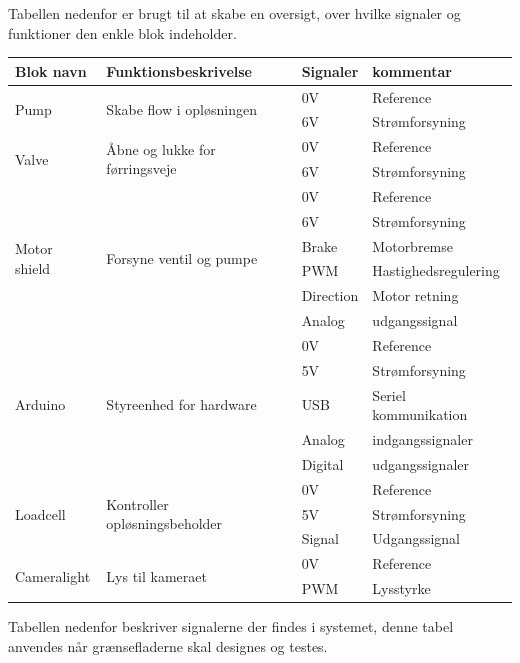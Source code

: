 Tabellen nedenfor er brugt til at skabe en oversigt, over hvilke signaler og funktioner den enkle blok indeholder.

\begin{center}
		\begin{longtable}{ | m{2cm} | m{6cm}| m{2cm}| m{4.5cm}| } 
			\hline
			\textbf{Blok navn} &\textbf{Funktionsbeskrivelse} &\textbf{Signaler} &\textbf{kommentar}\\ 
			\hline
			\multirow{2}{*}{Pump} & \multirow{2}{*}{Skabe flow i opløsningen} & 0V & Reference \\ 
& & 6V & Strømforsyning \\	
			\hline	
			\multirow{2}{*}{Valve} & \multirow{2}{*}{Åbne og lukke for førringsveje} & 0V & Reference \\ 
& & 6V & Strømforsyning \\	
			\hline	
		\multirow{6}{*}{Motor shield} & \multirow{6}{*}{Forsyne ventil og pumpe} & 0V & Reference \\ 
& & 6V & Strømforsyning \\	
& & Brake & Motorbremse \\	
& & PWM & Hastighedsregulering \\
& & Direction & Motor retning \\
& & Analog& udgangssignal \\
			\hline	
			\multirow{5}{*}{Arduino} & \multirow{5}{*}{Styreenhed for hardware} & 0V & Reference \\ 
& & 5V & Strømforsyning \\	
& & USB & Seriel kommunikation \\
& & Analog & indgangssignaler \\
& & Digital & udgangssignaler \\
			\hline
			\multirow{3}{*}{Loadcell} & \multirow{3}{*}{Kontroller opløsningsbeholder} & 0V & Reference \\ 
& & 5V & Strømforsyning \\	
& & Signal & Udgangssignal \\	
			\hline
			\multirow{2}{*}{Cameralight} & \multirow{2}{*}{Lys til kameraet} & 0V & Reference \\ 
& & PWM & Lysstyrke \\	
			\hline
		\end{longtable}
	\end{center}
	
Tabellen nedenfor beskriver signalerne der findes i systemet, denne tabel anvendes når grænsefladerne skal designes og testes.

